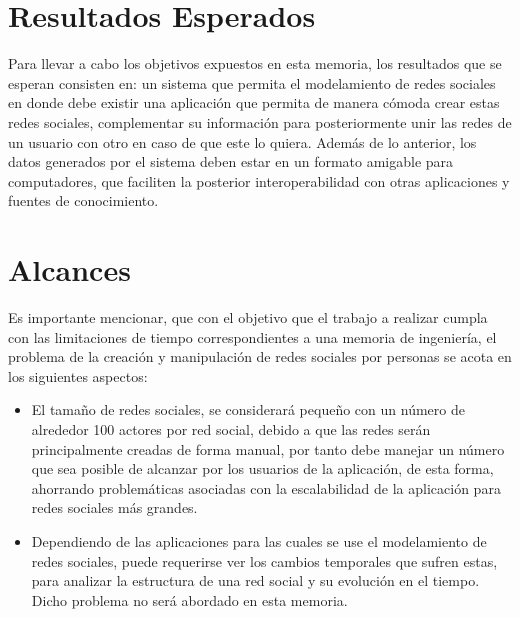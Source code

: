 
\section{Resultados Esperados} %
\label{sec:resultados_esperados}

Para llevar a cabo los objetivos expuestos en esta memoria, los resultados que se esperan consisten en: un sistema que permita el modelamiento de redes sociales en donde debe existir una aplicación que permita de manera cómoda crear estas redes sociales, complementar su información para posteriormente unir las redes de un usuario con otro en caso de que este lo quiera. Además de lo anterior, los datos generados por el sistema deben estar en un formato amigable para computadores, que faciliten la posterior interoperabilidad con otras aplicaciones y fuentes de conocimiento.


\section{Alcances} %
\label{sec:alcances}
% 

Es importante mencionar, que con el objetivo que el trabajo a realizar cumpla con las limitaciones de tiempo correspondientes a una memoria de ingeniería, el problema de la creación y manipulación de redes sociales por personas se acota en los siguientes aspectos:

\begin{itemize}
  \item El tamaño de redes sociales, se considerará pequeño con un número de alrededor 100 actores por red social, debido a que las redes serán principalmente creadas de forma manual, por tanto debe manejar un número que sea posible de alcanzar por los usuarios de la aplicación, de esta forma, ahorrando problemáticas asociadas con la escalabilidad de la aplicación para redes sociales más grandes.
  \item Dependiendo de las aplicaciones para las cuales se use el modelamiento de redes sociales, puede requerirse ver los cambios temporales que sufren estas, para analizar la estructura de una red social y su evolución en el tiempo. Dicho problema no será abordado en esta memoria.
\end{itemize}


